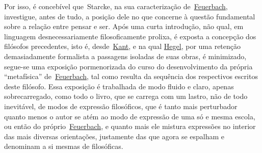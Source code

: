 Por isso, é concebível que~Starcke, na sua caracterização
de~\href{https://www.marxists.org/portugues/dicionario/verbetes/f/feuerbach.htm}{Feuerbach},
investigue, antes de tudo, a posição dele no que concerne à questão
fundamental sobre a relação entre pensar e ser. Após uma curta
introdução, não qual, em linguagem desnecessariamente filosoficamente
prolixa, é exposta a concepção dos filósofos precedentes, isto é,
desde~\href{https://www.marxists.org/portugues/dicionario/verbetes/k/kant.htm}{Kant},
e na qual
\href{https://www.marxists.org/portugues/dicionario/verbetes/h/hegel.htm}{Hegel},
por uma retenção demasiadamente formalista a passagens isoladas de suas
obras, é minimizado, segue-se uma exposição pormenorizada do curso do
desenvolvimento da própria ``metafísica''
de~\href{https://www.marxists.org/portugues/dicionario/verbetes/f/feuerbach.htm}{Feuerbach},
tal como resulta da sequência dos respectivos escritos deste filósofo.
Essa exposição é trabalhada de modo fluido e claro, apenas
sobrecarregado, como todo o livro, que se carrega com um lastro, não de
todo inevitável, de modos de expressão filosóficos, que é tanto mais
perturbador quanto menos o autor se atém ao modo de expressão de uma só
e mesma escola, ou então do
próprio~\href{https://www.marxists.org/portugues/dicionario/verbetes/f/feuerbach.htm}{Feuerbach},
e quanto mais ele mistura expressões no interior das mais diversas
orientações, justamente das que agora se espalham e denominam a si
mesmas de filosóficas.


